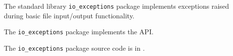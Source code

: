 
The standard library {\tt io\_exceptions} package implements exceptions raised during basic file input/output functionality.

The {\tt io\_exceptions} package implements the  API.

The {\tt io\_exceptions} package source code is in .




